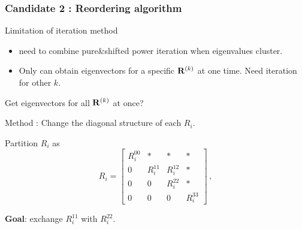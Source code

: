\documentclass[mathserif, handout]{beamer}
\begin{document}
\begin{frame}
  \frametitle{Candidate 2 : Reordering algorithm \cite{GranatK06}}
  
  \begin{exampleblock}{Limitation of iteration method}
    \begin{itemize}
    \item need to combine pure\&shifted power iteration
      when eigenvalues cluster.
    \item Only can obtain eigenvectors for a specific $\mathbf{R}^{(k)}$ at one
      time. Need iteration for other $k$.
    \end{itemize}
  \end{exampleblock}
  
  \pause
  
  Get eigenvectors for all $\mathbf{R}^{(k)}$ at once? 
  
  \pause
  
  Method : Change the diagonal structure of each $R_i$.
  
  \pause
  
  Partition $R_{i}$ as
  \[
  R_{i}=
  \left[
    \begin{array}{c|cc|c}
      R^{00}_{i} & * & *& * \\ \hline
      0 & R^{11}_{i} & R^{12}_{i} & * \\
      0 & 0 & R^{22}_{i} & * \\ \hline
      0 & 0 & 0 & R^{33}_{i}
    \end{array}
  \right]
  \,,
  \]
  
  \textbf{Goal}: {\color{red} exchange $R^{11}_{i}$ with $R^{22}_{i}$}.
  
  
\end{frame}
\end{document}
